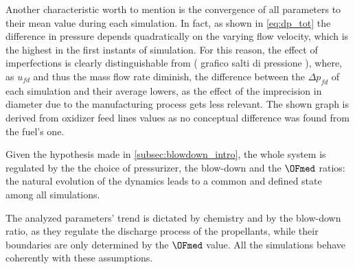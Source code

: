 Another characteristic worth to mention is the convergence of all parameters to their mean value during each simulation.
In fact, as shown in \autoref{eq:dp_tot} the difference in pressure depends quadratically on the varying flow velocity, which is the highest in the first instants of simulation.
For this reason, the effect of imperfections is clearly distinguishable from ( grafico salti di pressione ), where, as $u_{fd}$ and thus the mass flow rate diminish, the difference between the $\Delta p_{fd}$ of each simulation and their average lowers, as the effect of the imprecision in diameter due to the manufacturing process gets less relevant. The shown graph is derived from oxidizer feed lines values as no conceptual difference was found from the fuel's one. 

Given the hypothesis made in \autoref{subsec:blowdown_intro}, the whole system is regulated by the the choice of pressurizer, the blow-down and the $\OFmed$ ratios: the natural evolution of the dynamics leads to a common and defined state among all simulations.

The analyzed parameters' trend is dictated by chemistry and by the blow-down ratio, as they regulate the discharge process of the propellants, while their boundaries are only determined by the $\OFmed$ value. All the simulations behave coherently  with these assumptions. 











